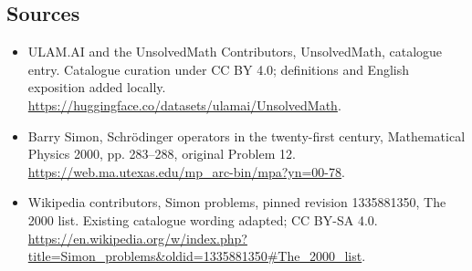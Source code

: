 \documentclass[11pt]{article}
\begin{document}
\subsection{Sources}
\begin{itemize}
\item[\hypertarget{source:statement:1}{S1}] ULAM.AI and the UnsolvedMath Contributors, UnsolvedMath, catalogue entry. Catalogue curation under CC BY 4.0; definitions and English exposition added locally.
\url{https://huggingface.co/datasets/ulamai/UnsolvedMath}.
\item[\hypertarget{source:statement:2}{S2}] Barry Simon, Schrödinger operators in the twenty-first century, Mathematical Physics 2000, pp. 283–288, original Problem 12.
\url{https://web.ma.utexas.edu/mp_arc-bin/mpa?yn=00-78}.
\item[\hypertarget{source:statement:3}{S3}] Wikipedia contributors, Simon problems, pinned revision 1335881350, The 2000 list. Existing catalogue wording adapted; CC BY-SA 4.0.
\url{https://en.wikipedia.org/w/index.php?title=Simon_problems&oldid=1335881350#The_2000_list}.
\end{itemize}
\label{end:statement}
\end{document}
